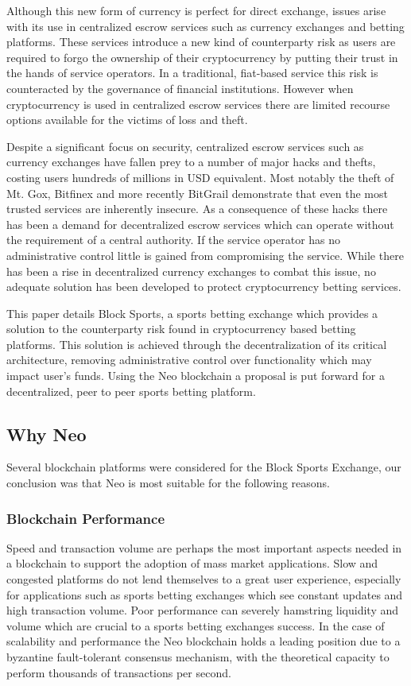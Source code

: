 \documentclass{article}
\begin{document}
Although this new form of currency is perfect for direct exchange, issues arise with its use in centralized escrow services such as currency exchanges and betting platforms. These services introduce a new kind of counterparty risk as users are required to forgo the ownership of their cryptocurrency by putting their trust in the hands of service operators. In a traditional, fiat-based service this risk is counteracted by the governance of financial institutions. However when cryptocurrency is used in centralized escrow services there are limited recourse options available for the victims of loss and theft.

Despite a significant focus on security, centralized escrow services such as currency exchanges have fallen prey to a number of major hacks and thefts, costing users hundreds of millions in USD equivalent. Most notably the theft of Mt. Gox, Bitfinex and more recently BitGrail demonstrate that even the most trusted services are inherently insecure. As a consequence of these hacks there has been a demand for decentralized escrow services which can operate without the requirement of a central authority. If the service operator has no administrative control little is gained from compromising the service. While there has been a rise in decentralized currency exchanges to combat this issue, no adequate solution has been developed to protect cryptocurrency betting services. 

This paper details Block Sports, a sports betting exchange which provides a solution to the counterparty risk found in cryptocurrency based betting platforms. This solution is achieved through the decentralization of its critical architecture, removing administrative control over functionality which may impact user’s funds. Using the Neo blockchain a proposal is put forward for a decentralized, peer to peer sports betting platform.

	\subsection{Why Neo}
Several blockchain platforms were considered for the Block Sports Exchange, our conclusion was that Neo is most suitable for the following reasons.

		\subsubsection{Blockchain Performance}
Speed and transaction volume are perhaps the most important aspects needed in a blockchain to support the adoption of mass market applications. Slow and congested platforms do not lend themselves to a great user experience, especially for applications such as sports betting exchanges which see constant updates and high transaction volume. Poor performance can severely hamstring liquidity and volume which are crucial to a sports betting exchanges success. In the case of scalability and performance the Neo blockchain holds a leading position due to a byzantine fault-tolerant consensus mechanism, with the theoretical capacity to perform thousands of transactions per second.
\end{document}
